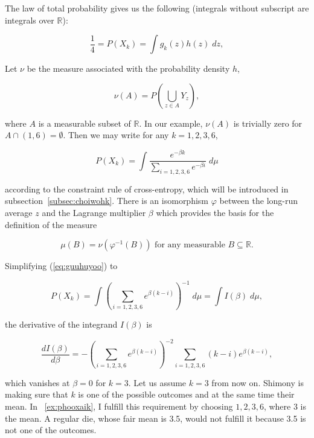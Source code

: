 \documentclass[phd,12pt,oneside]{ubcthesis}
\begin{document}
{\noindent}The law of total probability gives us the following
(integrals without subscript are integrals over $\mathbb{R}$):

\begin{equation}
  \label{eq:aeyeejoh}
\frac{1}{4}=P(X_{k})=\int{}g_{k}(z)h(z)\;{}dz,
\end{equation}

{\noindent}Let $\nu$ be the measure associated with the probability density $h$,

\begin{equation}
  \label{eq:yichoota}
  \nu(A)=P(\bigcup_{z\in{}A}Y_{z}),
\end{equation}

{\noindent}where $A$ is a measurable subset of $\mathbb{R}$. In our example,
$\nu(A)$ is trivially zero for $A\cap{}(1,6)=\emptyset$. Then we may write
for any $k=1,2,3,6$,

\begin{equation}
  \label{eq:guuhuyoo}
  P(X_{k})=\int\frac{e^{-\beta{}k}}{\sum_{i=1,2,3,6}e^{-\beta{}i}}\;{}d\mu
\end{equation}

{\noindent}according to the constraint rule of cross-entropy, which
will be introduced in subsection~\ref{subsec:choiwohk}. There is an
isomorphism $\varphi$ between the long-run average $z$ and the
Lagrange multiplier $\beta$ which provides the basis for the
definition of the measure

\begin{equation}
  \label{eq:ohkeecae}
  \mu(B)=\nu(\varphi^{-1}(B))\mbox{ for any measurable }B\subseteq{}\mathbb{R}.
\end{equation}

{\noindent}Simplifying (\ref{eq:guuhuyoo}) to

\begin{equation}
  \label{eq:yaxohhae}
  P(X_{k})=\int\left(\sum_{i=1,2,3,6}e^{\beta(k-i)}\right)^{-1}\;{}d\mu=\int{}I(\beta)\;{}d\mu,
\end{equation}

{\noindent}the derivative of the integrand $I(\beta)$ is

\begin{equation}
  \label{eq:phoophie}
  \frac{dI(\beta)}{d\beta}=-\left(\sum_{i=1,2,3,6}e^{\beta(k-i)}\right)^{-2}\sum_{i=1,2,3,6}(k-i)e^{\beta(k-i)},
\end{equation}

{\noindent}which vanishes at $\beta=0$ for $k=3$. Let us assume $k=3$
from now on. Shimony is making sure that $k$ is one of the possible
outcomes and at the same time their mean. In
{\xample}~\ref{ex:phooxaik}, I fulfill this requirement by choosing
$1,2,3,6$, where $3$ is the mean. A regular die, whose fair mean is
3.5, would not fulfill it because 3.5 is not one of the outcomes.
\end{document}

